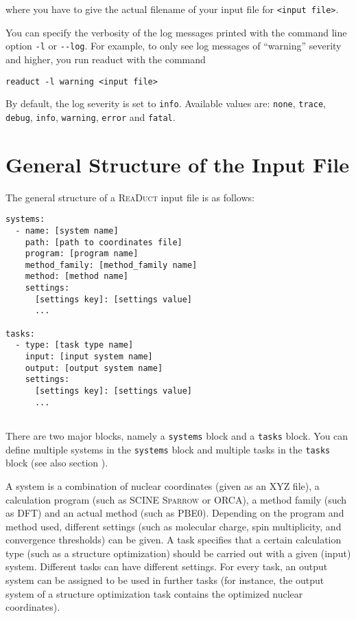 \documentclass[]{tufte-book}
\begin{document}
where you have to give the actual filename of your input file for \texttt{<input file>}.

You can specify the verbosity of the log messages printed with the command line option \texttt{-l} or \texttt{-{}-log}. For
example, to only see log messages of ``warning'' severity and higher, you run readuct with the command

\begin{verbatim}
readuct -l warning <input file>
\end{verbatim}

By default, the log severity is set to \texttt{info}. Available values are: \texttt{none}, \texttt{trace}, \texttt{debug}, \texttt{info}, \texttt{warning},
\texttt{error} and \texttt{fatal}.


\section{General Structure of the Input File}

The general structure of a \textsc{ReaDuct} input file is as follows:

\begin{verbatim}
systems:
  - name: [system name]
    path: [path to coordinates file]
    program: [program name]
    method_family: [method_family name]
    method: [method name]
    settings:
      [settings key]: [settings value]
      ...

tasks:
  - type: [task type name]
    input: [input system name]
    output: [output system name]
    settings:
      [settings key]: [settings value]
      ...
 
\end{verbatim}

There are two major blocks, namely a \texttt{systems} block and a \texttt{tasks} block. You can define multiple systems
in the \texttt{systems} block and multiple tasks in the \texttt{tasks} block (see also section ).

A system is a combination of nuclear coordinates (given as an XYZ file), a calculation program (such as SCINE \textsc{Sparrow}
or ORCA), a method family (such as DFT) and an actual method (such as PBE0). Depending on the program and method used,
different settings (such as molecular charge, spin multiplicity, and convergence thresholds) can be given.
A task specifies that a certain calculation type (such as a
structure optimization) should be carried out with a given (input) system. Different tasks can have different settings.
For every task, an output system can be assigned to be used in further tasks (for instance, the output system of a
structure optimization task contains the optimized nuclear coordinates).
\end{document}
